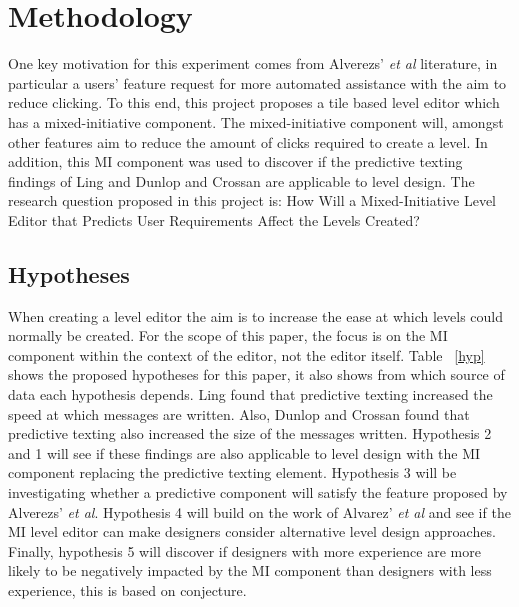 \documentclass[journal]{IEEEtran}
\begin{document}
\section{Methodology}
One key motivation for this experiment comes from Alverezs' \textit{et al}\cite{alvarez2018fostering} literature, in particular a users' feature request for more automated assistance with the aim to reduce clicking. To this end, this project proposes a tile based level editor which has a mixed-initiative component. The mixed-initiative component will, amongst other features aim to reduce the amount of clicks required to create a level. In addition, this MI component was used to discover if the predictive texting findings of Ling \cite{ling2005length} and Dunlop and Crossan\cite{dunlop2000predictive} are applicable to level design. The research question proposed in this project is: How Will a Mixed-Initiative Level Editor that Predicts User Requirements Affect the Levels Created? 

\subsection{Hypotheses}\label{Hypotheses}
When creating a level editor the aim is to increase the ease at which levels could normally be created. For the scope of this paper, the focus is on the MI component within the context of the editor, not the editor itself. Table ~\ref{hyp} shows the proposed hypotheses for this paper, it also shows from which source of data each hypothesis depends. Ling \cite{ling2005length} found that predictive texting increased the speed at which messages are written. Also, Dunlop and Crossan\cite{dunlop2000predictive} found that predictive texting also increased the size of the messages written. Hypothesis 2 and 1 will see if these findings are also applicable to level design with the MI component replacing the predictive texting element. Hypothesis 3 will be investigating whether a predictive component will satisfy the feature proposed by Alverezs' \textit{et al}\cite{alvarez2018fostering}. Hypothesis 4 will build on the work of Alvarez' \textit{et al}\cite{alvarez2018fostering} and see if the MI level editor can make designers consider alternative level design approaches. Finally, hypothesis 5 will discover if designers with more experience are more likely to be negatively impacted by the MI component than designers with less experience, this is based on conjecture.
\end{document}
